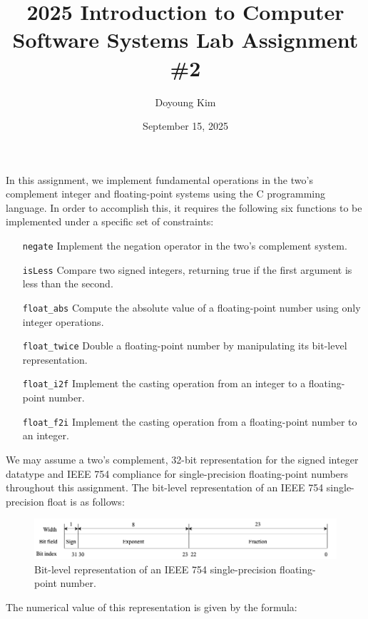 \documentclass{article}
\title{\textbf{2025 Introduction to Computer Software Systems Lab Assignment
\#2}}
\date{September 15, 2025}
\author{Doyoung Kim}
\begin{document}
\maketitle

In this assignment, we implement fundamental operations in the two's complement 
integer and floating-point systems using the C programming language. In order to 
accomplish this, it requires the following six functions to be implemented under 
a specific set of constraints:

\begin{enumerate}
    \item[\texttt{negate}] Implement the negation operator in the two's 
    complement system.
    \item[\texttt{isLess}] Compare two signed integers, returning true if the 
    first argument is less than the second.
    \item[\texttt{float\_abs}] Compute the absolute value of a floating-point
    number using only integer operations.
    \item[\texttt{float\_twice}] Double a floating-point number by manipulating 
    its bit-level representation.
    \item[\texttt{float\_i2f}] Implement the casting operation from an integer 
    to a floating-point number.
    \item[\texttt{float\_f2i}] Implement the casting operation from a
    floating-point number to an integer.
\end{enumerate}

We may assume a two's complement, 32-bit representation for the signed integer
datatype and IEEE 754 compliance for single-precision floating-point numbers
throughout this assignment. The bit-level representation of an IEEE 754
single-precision float is as follows:

\begin{figure}[h]
    \centering
    \includegraphics[width=1\textwidth]{figure1.png}
    \caption{
        Bit-level representation of an IEEE 754 single-precision floating-point 
        number.
    }
\end{figure}

\newpage

The numerical value of this representation is given by the formula:
\end{document}

